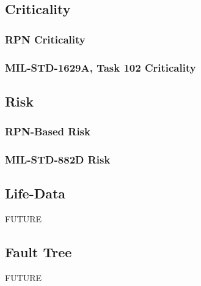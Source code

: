 \documentclass[11pt, 12pt, twoside, onecolumn]{article}
\begin{document}
\subsection{\bf \large Criticality}
\subsubsection{\bf RPN Criticality}
\subsubsection{\bf MIL-STD-1629A, Task 102 Criticality}

\subsection{\bf \large Risk}
\subsubsection{\bf RPN-Based Risk}
\subsubsection{\bf MIL-STD-882D Risk}

\subsection{\bf \large Life-Data}

\noindent FUTURE

\subsection{\bf \large Fault Tree}

\noindent FUTURE
\end{document}
